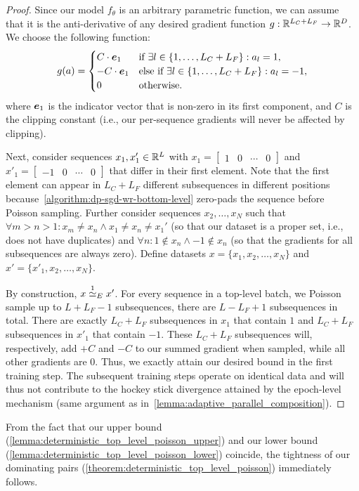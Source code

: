\begin{proof}
    Since our model $f_\theta$ is an arbitrary parametric function,
    we can assume that it is the anti-derivative of any desired gradient function $g : {\mathbb{R}}^{L_C + L_F} \rightarrow {\mathbb{R}}^D$.
    We choose the following function:
    \begin{equation*}
        g(a) = \begin{cases}
            C \cdot {\bm{e}}_1 & \text{if } \exists l \in \{1,\dots,L_C + L_F\} : a_l = 1, \\
            -C \cdot {\bm{e}}_1 & \text{else if } \exists l \in \{1,\dots,L_C + L_F\} : a_l = -1, \\
            0  & \text{otherwise.}
        \end{cases}
    \end{equation*}
    where ${\bm{e}}_1$ is the indicator vector that is non-zero in its first component, 
    and $C$ is the clipping constant (i.e., our per-sequence gradients will never be affected by clipping).
     
    Next, consider sequences $x_1, x'_1 \in {\mathbb{R}}^{L}$ with
    $x_1 = \begin{bmatrix}
        1 & 0 & \cdots & 0
    \end{bmatrix}$
    and 
    $x'_1 = \begin{bmatrix}
        -1 & 0 & \cdots & 0
    \end{bmatrix}$
    that differ in their first element.
    Note that the first element can appear in $L_C + L_F$ different subsequences in different positions because~\cref{algorithm:dp-sgd-wr-bottom-level} zero-pads the sequence before Poisson sampling.
    Further consider sequences $x_2,\dots,x_N$ such that $\forall m > n > 1 : x_m \neq x_n \land x_1 \neq x_n \neq x_1'$ (so that our dataset is a proper set, i.e., does not have duplicates)
    and $\forall n: 1 \notin x_n \land -1 \notin x_n$ (so that the gradients for all subsequences are always zero).
    Define datasets $x = \{x_1,x_2,\dots,x_N\}$ and $x' = \{x'_1,x_2,\dots,x_N\}$.
    
    By construction, $x \overset{1}{\simeq}_{E} x'$.
    For every sequence in a top-level batch,
    we Poisson sample up to $L + L_F -1$ subsequences, there are $L - L_F + 1$ subsequences in total. There are exactly $L_C + L_F$ subsequences in $x_1$ that contain $1$ and $L_C + L_F$ subsequences in $x'_1$ that contain $-1$. 
    These $L_C + L_F$ subsequences will, respectively, add $+C$ and $-C$ to our summed gradient when sampled, while all other gradients are $0$. Thus, we exactly attain our desired bound in the first training step.
    The subsequent training steps operate on identical data and will thus not contribute to the hockey stick divergence attained by the epoch-level mechanism (same argument as in~\cref{lemma:adaptive_parallel_composition}).
\end{proof}
From the fact that our upper bound (\cref{lemma:deterministic_top_level_poisson_upper})
and our lower bound
 (\cref{lemma:deterministic_top_level_poisson_lower}) coincide, the tightness of our dominating pairs (\cref{theorem:deterministic_top_level_poisson}) immediately follows.


